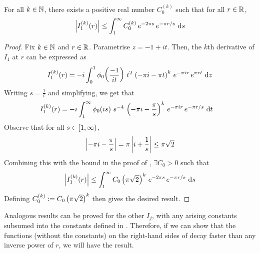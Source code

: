 \begin{boxlemma}\label{Ch4:Lemma:Reducing_higher_deriv_Schwartzness_I_1}
    For all $k \in \mathbb{N}$, there exists a positive real number $C_0^{(k)}$ such that for all $r \in \mathbb{R}$,
    \begin{align*}
        \left\lvert I_1^{(k)}\!\left( r \right) \right\rvert \leq \int_{1}^{\infty} C_0^{(k)} \, e^{-2\pi s} \, e^{- \pi r / s} \, \operatorname{d}\!{s}
    \end{align*}
\end{boxlemma}
\begin{proof}
    Fix $k \in \mathbb{N}$ and $r \in \mathbb{R}$. Parametrise $z = -1 + it$. Then, the $k$th derivative of $I_1$ at $r$ can be expressed as
    \begin{align*}
        I_1^{(k)}\!\left( r \right) = -i \int_{0}^{1} \phi_0\!\left( \frac{-1}{it} \right) \, t^2 \, \left( -\pi i - \pi t \right)^k \, e^{-\pi i r} \, e^{\pi r t} \, \operatorname{d}\!{z}
    \end{align*}
    Writing $s = \frac{1}{t}$ and simplifying, we get that
    \begin{align*}
        I_1^{(k)}\!\left( r \right) &= -i \int_{1}^{\infty}
            \phi_0\!\left( is \right) \,
            s^{-4} \,
            \left( -\pi i - \frac{\pi}{s} \right)^k \,
            e^{-\pi i r} \,
            e^{-\pi r / s}\,
            \operatorname{d}\!{t}
    \end{align*}
    Observe that for all $s \in \left[1, \infty\right)$,
    \begin{align*}
        \left\lvert -\pi i - \frac{\pi}{s} \right\rvert = \pi \left\lvert i + \frac{1}{s} \right\rvert \leq \pi \sqrt{2}
    \end{align*}
    Combining this with the bound in the proof of , $\exists C_0 > 0$ such that
    \begin{align*}
        \left\lvert I_1^{(k)}\!\left( r \right) \right\rvert \leq \int_{1}^{\infty} C_0 \left( \pi \sqrt{2} \right)^{k} \, e^{-2\pi s} \, e^{- \pi r / s} \, \operatorname{d}\!{s}
    \end{align*}
    Defining $C_0^{(k)} := C_0 \left( \pi \sqrt{2} \right)^{k}$ then gives the desired result.
\end{proof}

Analogous results can be proved for the other $I_j$, with any arising constants subsumed into the constants defined in . Therefore, if we can show that the functions (without the constants) on the right-hand sides of  decay faster than any inverse power of $r$, we will have the result.

